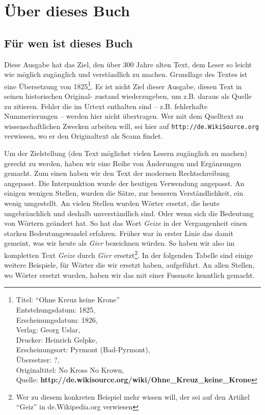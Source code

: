 

\part{Über dieses Buch}


\chapter{Für wen ist dieses Buch}

Diese Ausgabe hat das Ziel, den über 300 Jahre alten Text, dem Leser
so leicht wie möglich zugänglich und verständlich zu machen. Grundlage
des Textes ist eine Übersetzung von 1825\footnote{
Titel: "`Ohne Kreuz keine Krone"' \\
Entstehungsdatum: 1825, \\
Erscheinungsdatum: 1826, \\
Verlag: Georg Uslar, \\
Drucker: Heinrich Gelpke, \\
Erscheinungsort: Pyrmont (Bad-Pyrmont),\\
Übersetzer: ?, \\
Originaltitel: No Kross No Krown, \\
Quelle: \textbf{http://de.wikisource.org/wiki/Ohne\_Kreuz\_keine\_Krone}}. Es
ist nicht Ziel dieser Ausgabe, diesen Text in seinen historischen Original-
zustand wiederzugeben, um z.B. daraus als Quelle zu zitieren. Fehler die im
Urtext enthalten sind -- z.B. fehlerhafte Nummerierungen -- werden hier nicht
übertragen. Wer mit dem Quelltext zu wissenschaftlichen Zwecken arbeiten will,
sei hier auf \texttt{http://de.WikiSource.org} verwiesen, wo er den
Originaltext als Scann findet.

\medskip

Um der Zielstellung (den Text möglichst vielen Lesern zugänglich zu machen)
gerecht zu werden, haben wir eine Reihe von Änderungen und Ergänzungen gemacht.
Zum einen haben wir den Text der modernen Rechtschreibung angepasst. Die
Interpunktion wurde der heutigen Verwendung angepasst. An einigen wenigen Stellen,
wurden die Sätze, zur besseren Verständlichkeit, ein wenig umgestellt. An vielen
Stellen wurden Wörter ersetzt, die heute ungebräuchlich und deshalb
unverständlich sind. Oder wenn sich die Bedeutung von Wörtern geändert hat. So
hat das Wort \textit{Geize} in der Vergangenheit einen starken Bedeutungswandel
erfahren. Früher war in erster Linie das damit gemeint, was wir heute als
\textit{Gier} bezeichnen würden. So haben wir also im kompletten Text
\textit{Geize} durch \textit{Gier} ersetzt\footnote{Wer zu diesem konkreten
Beispiel mehr wissen will, der sei auf den Artikel "`Geiz"' in de.Wikipedia.org
verwiesen}. In der folgenden Tabelle sind einige
weitere Beispiele, für Wörter die wir ersetzt haben, aufgeführt. An allen
Stellen, wo Wörter ersetzt wurden, haben wir das mit einer Fussnote kenntlich
gemacht.

